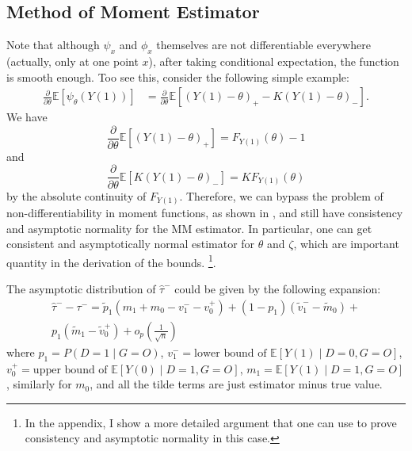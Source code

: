 \documentclass[12pt]{article}
\newcommand{\Ep}{\mathbb{E}}
\begin{document}
	\subsection{Method of Moment Estimator}
	Note that although $\psi_x$ and $\phi_x$ themselves are not differentiable everywhere (actually, only at one point $x$), after taking conditional expectation, the function is smooth enough. Too see this, consider the following simple example: 
		\begin{align*}
		\frac{\partial}{\partial \theta}\Ep[\psi_{\theta}(Y(1))] & = \frac{\partial}{\partial \theta} \Ep[(Y(1) - \theta)_+ - K (Y(1) - \theta)_-].
		\end{align*}
		We have
		$$\frac{\partial}{\partial \theta} \Ep[(Y(1) - \theta)_+] = F_{Y(1)}(\theta) - 1$$
		and 
		$$\frac{\partial}{\partial \theta} \Ep[K(Y(1) - \theta)_-] = K F_{Y(1)}(\theta) $$
		by the absolute continuity of $F_{Y(1)}$. Therefore, we can bypass the problem of non-differentiability in moment functions, as shown in \textcite{andrews1994asymptotics}, and still have consistency and asymptotic normality for the MM estimator. 
        In particular, one can get consistent and asymptotically normal estimator for $\theta$ and $\zeta$, which are important quantity in the derivation of the bounds. \footnote{In the appendix, I show a more detailed argument that one can use to prove consistency and asymptotic normality in this case.}.
	
	The asymptotic distribution of $\hat{\tau}^-$ could be given by the following expansion:
	\begin{equation}\label{eqn:deltamethod}
	    \begin{aligned}
            \hat{\tau}^{-} - \tau^- = \tilde{p}_1 (m_1 + m_0 - v_1^- - v_0^+) + (1- p_1)(\tilde{v}_1^- - \tilde{m}_0) + \\p_1 (\tilde{m}_1 - \tilde{v}_0^+) + o_p(\frac{1}{\sqrt{n}})
        \end{aligned}
	\end{equation}
    where $p_1 = P(D =1 \mid G = O)$, $v_1^- = \text{lower bound of } \mathbb{E}[Y(1) \mid D = 0, G = O]$, $v_0^+ = \text{upper bound of }\mathbb{E}[Y(0) \mid D = 1, G = O]$, $m_1 = \mathbb{E}[Y(1) \mid D = 1, G = O]$, similarly for $m_0$, and all the tilde terms are just estimator minus true value.
    
\end{document}
